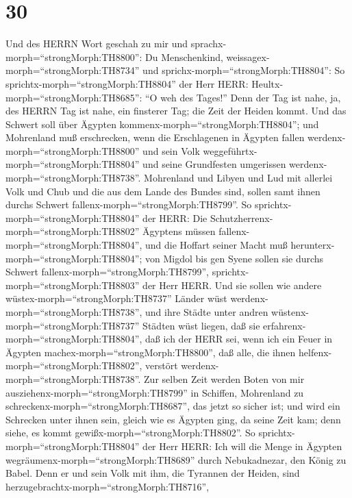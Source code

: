 \hypertarget{section-29}{%
\section{30}\label{section-29}}

 Und des HERRN Wort geschah zu mir und
sprachx-morph=``strongMorph:TH8800'':  Du Menschenkind,
weissagex-morph=``strongMorph:TH8734'' und
sprichx-morph=``strongMorph:TH8804'': So
sprichtx-morph=``strongMorph:TH8804'' der Herr HERR:
Heultx-morph=``strongMorph:TH8685'': ``O weh des Tages!'' 
Denn der Tag ist nahe, ja, des HERRN Tag ist nahe, ein finsterer Tag;
die Zeit der Heiden kommt.  Und das Schwert soll über
Ägypten kommenx-morph=``strongMorph:TH8804''; und Mohrenland muß
erschrecken, wenn die Erschlagenen in Ägypten fallen
werdenx-morph=``strongMorph:TH8800'' und sein Volk
weggeführtx-morph=``strongMorph:TH8804'' und seine Grundfesten
umgerissen werdenx-morph=``strongMorph:TH8738''.  Mohrenland
und Libyen und Lud mit allerlei Volk und Chub und die aus dem Lande des
Bundes sind, sollen samt ihnen durchs Schwert
fallenx-morph=``strongMorph:TH8799''.  So
sprichtx-morph=``strongMorph:TH8804'' der HERR: Die
Schutzherrenx-morph=``strongMorph:TH8802'' Ägyptens müssen
fallenx-morph=``strongMorph:TH8804'', und die Hoffart seiner Macht muß
herunterx-morph=``strongMorph:TH8804''; von Migdol bis gen Syene sollen
sie durchs Schwert fallenx-morph=``strongMorph:TH8799'',
sprichtx-morph=``strongMorph:TH8803'' der Herr HERR.  Und
sie sollen wie andere wüstex-morph=``strongMorph:TH8737'' Länder wüst
werdenx-morph=``strongMorph:TH8738'', und ihre Städte unter andren
wüstenx-morph=``strongMorph:TH8737'' Städten wüst liegen, 
daß sie erfahrenx-morph=``strongMorph:TH8804'', daß ich der HERR sei,
wenn ich ein Feuer in Ägypten machex-morph=``strongMorph:TH8800'', daß
alle, die ihnen helfenx-morph=``strongMorph:TH8802'', verstört
werdenx-morph=``strongMorph:TH8738''.  Zur selben Zeit
werden Boten von mir ausziehenx-morph=``strongMorph:TH8799'' in
Schiffen, Mohrenland zu schreckenx-morph=``strongMorph:TH8687'', das
jetzt so sicher ist; und wird ein Schrecken unter ihnen sein, gleich wie
es Ägypten ging, da seine Zeit kam; denn siehe, es kommt
gewißx-morph=``strongMorph:TH8802''.  So
sprichtx-morph=``strongMorph:TH8804'' der Herr HERR: Ich will die Menge
in Ägypten wegräumenx-morph=``strongMorph:TH8689'' durch Nebukadnezar,
den König zu Babel.  Denn er und sein Volk mit ihm, die
Tyrannen der Heiden, sind herzugebrachtx-morph=``strongMorph:TH8716'',
